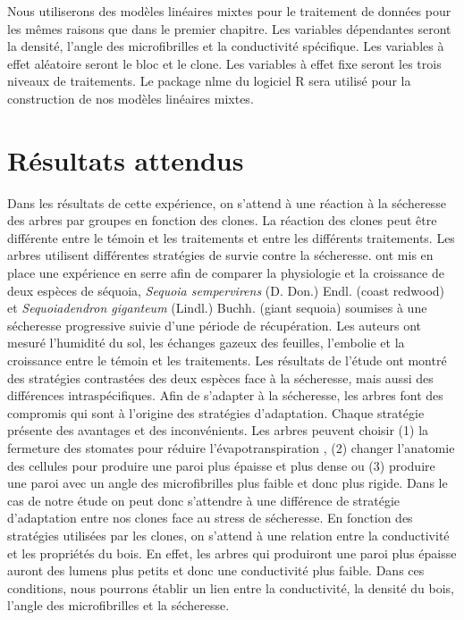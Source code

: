 \documentclass{report}
\begin{document}
Nous utiliserons des modèles linéaires mixtes pour le traitement de données pour les mêmes raisons que dans le premier chapitre. Les variables dépendantes seront la densité, l'angle des microfibrilles et la conductivité spécifique. Les variables à effet aléatoire seront le bloc et le clone. %
Les variables à effet fixe seront les trois niveaux de traitements. Le package nlme \citep{NLME2018} du logiciel R sera utilisé pour la construction de nos modèles linéaires mixtes. 

\section{Résultats attendus}

Dans les résultats de cette expérience, on s'attend à une réaction à la sécheresse des arbres par groupes en fonction des clones. La réaction des clones peut être différente entre le témoin et les traitements et entre les différents traitements. Les arbres utilisent différentes stratégies de survie contre la sécheresse. \cite{Ambrose2015} ont mis en place une expérience en serre afin de comparer la physiologie et la croissance de deux espèces de séquoia, \textit{Sequoia sempervirens} (D. Don.) Endl. (coast redwood) et \textit{Sequoiadendron giganteum} (Lindl.) Buchh. (giant sequoia) soumises à une sécheresse progressive suivie d'une période de récupération. Les auteurs ont mesuré l'humidité du sol, les échanges gazeux des feuilles, l'embolie et la croissance entre le témoin et les traitements. Les résultats de l'étude ont montré des stratégies contrastées des deux espèces face à la sécheresse, mais aussi des différences intraspécifiques. Afin de s'adapter à la sécheresse, les arbres font des compromis qui sont à l'origine des stratégies d'adaptation. Chaque stratégie présente des avantages et des  inconvénients. Les arbres peuvent choisir (1) la fermeture des stomates pour réduire l'évapotranspiration \citep{Martinez-Sancho2017}, (2) changer l'anatomie des cellules pour produire une paroi plus épaisse et plus dense ou (3) produire une paroi avec un angle des microfibrilles plus faible et donc plus rigide. Dans le cas de notre étude on peut donc s'attendre à une différence de stratégie d'adaptation entre nos clones face au stress de sécheresse. En fonction des stratégies utilisées par les clones, on s'attend à une relation entre la conductivité et les propriétés du bois. En effet, les arbres qui produiront une paroi plus épaisse auront des lumens plus petits et donc une conductivité plus faible. Dans ces conditions, nous pourrons établir un lien entre la conductivité, la densité du bois, l'angle des microfibrilles et la sécheresse. \\ %
\end{document}
